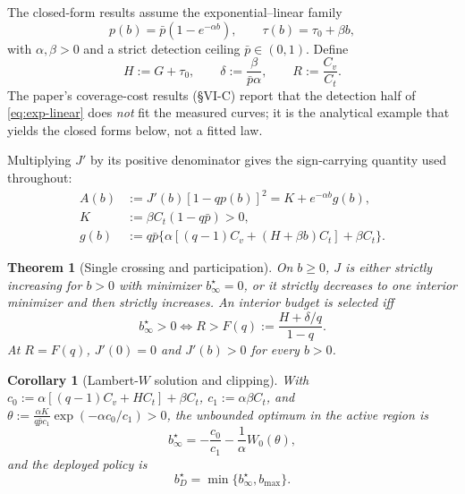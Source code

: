 \documentclass[journal]{IEEEtran}
\newtheorem{theorem}{Theorem}
\newtheorem{corollary}{Corollary}
\theoremstyle{definition}
\begin{document}
The closed-form results assume the exponential--linear family
\begin{equation}
 p(b)=\bar p(1-e^{-\alpha b}),\qquad
 \tau(b)=\tau_0+\beta b,
\label{eq:exp-linear}
\end{equation}
with \(\alpha,\beta>0\) and a strict detection ceiling \(\bar p\in(0,1)\).
Define
\begin{equation}
 H:=G+\tau_0,\qquad
 \delta:=\frac{\beta}{\bar p\alpha},\qquad
 R:=\frac{C_v}{C_t}.
\label{eq:constants}
\end{equation}
The paper's coverage-cost results (\S VI-C) report that the detection half of
\eqref{eq:exp-linear} does \emph{not} fit the measured curves; it is the
analytical example that yields the closed forms below, not a fitted law.

Multiplying \(J'\) by its positive denominator gives the sign-carrying
quantity used throughout:
\begin{align}
 A(b)&:=J'(b)[1-qp(b)]^2=K+e^{-\alpha b}g(b),\label{eq:Ab}\\
 K&:=\beta C_t(1-q\bar p)>0,\nonumber\\
 g(b)&:=q\bar p\{\alpha[(q-1)C_v+(H+\beta b)C_t]+\beta C_t\}.\nonumber
\end{align}

\begin{theorem}[Single crossing and participation]
\label{thm:single-crossing}
On \(b\geq0\), \(J\) is either strictly increasing for \(b>0\) with
minimizer \(b_\infty^\star=0\), or it strictly decreases to one interior
minimizer and then strictly increases.  An interior budget is selected iff
\begin{equation}
 b_\infty^\star>0
 \iff
 R>F(q):=\frac{H+\delta/q}{1-q}.
\label{eq:participation}
\end{equation}
At \(R=F(q)\), \(J'(0)=0\) and \(J'(b)>0\) for every \(b>0\).
\end{theorem}

\begin{corollary}[Lambert-\(W\) solution and clipping]
\label{cor:lambert}
With
\(c_0:=\alpha[(q-1)C_v+HC_t]+\beta C_t\),
\(c_1:=\alpha\beta C_t\), and
\(\theta:=\frac{\alpha K}{q\bar p c_1}\exp(-\alpha c_0/c_1)>0\),
the unbounded optimum in the active region is
\begin{equation}
 b_\infty^\star=-\frac{c_0}{c_1}-\frac{1}{\alpha}W_0(\theta),
\label{eq:lambert}
\end{equation}
and the deployed policy is
\begin{equation}
 b_D^\star=\min\{b_\infty^\star,b_{\max}\}.
\label{eq:clipping}
\end{equation}
\end{corollary}
\end{document}
